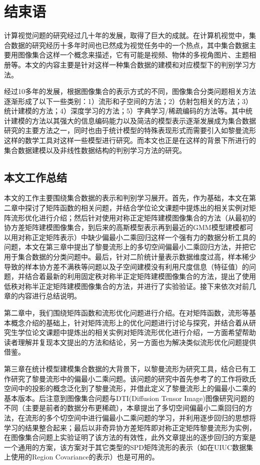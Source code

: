 \chapter{结束语}
\label{chap:The_End}
计算视觉问题的研究经过几十年的发展，取得了巨大的成就。在计算机视觉中，集合数据的研究经历十多年时间也已然成为视觉任务中的一个热点，其中集合数据主要用图像集合这样一个概念来描述，它有可能是视频、物体的多视角图片、主题相册等。本文的内容主要是针对这样一种集合数据的建模和对应模型下的判别学习方法。

经过10多年的发展，根据图像集合的表示方式的不同，图像集合分类问题相关方法逐渐形成了以下一些类别：1）流形和子空间的方法；2）仿射包相关的方法；3）统计建模的方法；4）深度学习的方法；5）字典学习/稀疏编码的方法等。其中统计建模的方法以其强大的信息编码能力以及简洁的模型表示逐渐发展成为集合数据研究的主要方法之一，同时也由于统计模型的特殊表现形式而需要引入如黎曼流形这样的数学工具对这样一些模型进行研究。而本文也正是在这样的背景下所进行的集合数据建模以及非线性数据结构的判别学习方法的研究。
\section{本文工作总结}
\label{sec:Conclusion}
本文的工作主要围绕集合数据的表示和判别学习展开。首先，作为基础，本文在第二章中探讨了矩阵函数的相关问题，并结合学位论文课题中提炼出的相关实例对矩阵流形优化进行介绍；然后针对使用对称正定矩阵建模图像集合的方法（从最初的协方差矩阵建模图像集合，到后来的高斯模型表示再到最近的GMM模型建模都可以用对称正定矩阵表示）中缺少偏最小二乘回归这样一个强有力的数据分析工具的问题，本文在第三章中提出了黎曼流形上的多切空间偏最小二乘回归方法，并把它用于集合数据的分类问题中。最后，针对二阶统计量表示数据维度过高，样本稀少导致的样本协方差不满秩等问题以及子空间建模没有利用尺度信息（特征值）的问题，并结合着最新的利用固定秩对称半正定矩阵建模图像集合的方法，提出了使用低秩对称半正定矩阵建模图像集合的方法，并进行了实验验证。接下来依次对前几章的内容进行总结说明。

第二章中，我们围绕矩阵函数和流形优化问题进行介绍。在对矩阵函数，流形等基本概念介绍的基础上，针对矩阵流形上的优化问题进行讨论与探究，并结合着从研究生学位论文课题中提炼出的相关实例对矩阵流形优化进行介绍，一方面希望帮助读者理解并复现本文提出的方法和结论，另一方面也为解决类似流形优化问题提供借鉴。

第三章在统计模型建模集合数据的大背景下，以黎曼流形为研究工具，结合已有工作\cite{PGA,RCCA}研究了黎曼流形中的偏最小二乘问题。该问题的研究中首先参考了\cite{PGA,RCCA}的工作将欧氏空间中的投影的概念泛化到了黎曼流形，并借此定义了黎曼流形上的偏最小二乘的基本版本。后注意到图像集合问题与DTI(Diffusion Tensor Image)图像研究问题的不同（主要是前者的数据分布更稀疏），本章提出了多切空间偏最小二乘回归的方法，在流形的多个切空间中进行偏最小二乘问题的学习，并利用逐步回归的思想将学习的结果整合起来；最后以非奇异协方差矩阵即对称正定矩阵黎曼流形为实例，在图像集合问题上实验证明了该方法的有效性，此外文章提出的逐步回归的方案是一个通用的方案，该方案对于其它类型的SPD矩阵流形的表示（如在UIUC\cite{Database_UIUC}数据集上使用的Region Covariance的表示）也是可用的。

